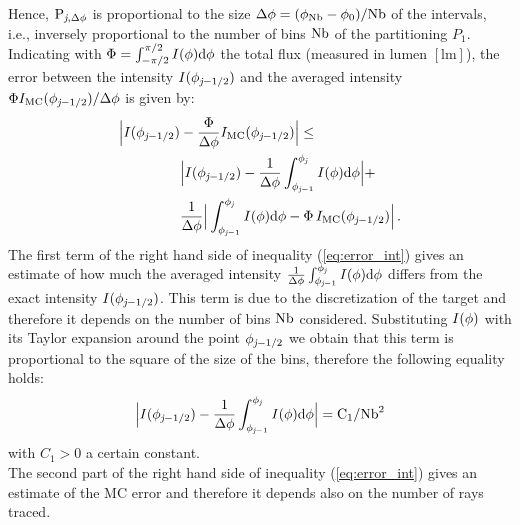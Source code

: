 Hence, $\textrm{P}_{\textit{j}, \Delta\phi}$ is proportional to the size $\Delta\phi= (\phi_{\textrm{Nb}}-\phi_{0})/{\textrm{Nb}}$ 
of the intervals, i.e., inversely proportional to the number of bins $\textrm{Nb}$ of the partitioning $P_1$.
Indicating with $\Phi = \int_{-\pi/2}^{\pi/2}I(\phi) \textrm{d}\phi$ the total flux (measured in lumen $[\textrm{lm}]$),
the error between the intensity $I(\phi_{\textit{j}-1/2})$
 and the averaged  intensity $\Phi I_{\textrm{MC}}(\phi_{\textit{j}-1/2})/\Delta\phi$ is given by:
\begin{equation}\label{eq:error_int}
\begin{aligned}
\Big|I(\phi_{\textit{j}-1/2})&-\frac{\Phi}
{\Delta\phi}I_{\textrm{MC}}(\phi_{\textit{j}-1/2})\Big| \leq\\
 &\Big|I(\phi_{\textit{j}-1/2})-\frac{1}{\Delta \phi}\int_{\phi_{\textit{j}-1}}^{\phi_{\textit{j}}} I(\phi)\textrm{d}\phi\Big|+\\
&\frac{1}{\Delta \phi}\Big|\int_{\phi_{\textit{j}-1}}^{\phi_{\textit{j}}} I(\phi)\textrm{d}\phi-
\Phi\, I_{\textrm{MC}}(\phi_{\textit{j}-1/2})\Big| \,.
\end{aligned}
\end{equation}
\indent The first term of the right hand side of inequality (\ref{eq:error_int}) gives an estimate of how much the averaged intensity
 $\frac{1}{\Delta \phi}\int_{\phi_{\textit{j}-1}}^{\phi_{\textit{j}}} I(\phi)\textrm{d}\phi$ differs from the exact intensity $I(\phi_{\textit{j}-1/2})$.
This term is due to the discretization of the target and therefore it depends on the number of bins $\textrm{Nb}$ considered.
  Substituting $I(\phi)$ with its Taylor expansion around the point $\phi_{\textit{j}-1/2}$ we obtain that this term is proportional to the square of the size of the bins, therefore the following equality holds:
\begin{equation}\Big|I(\phi_{\textit{j}-1/2})-\frac{1}{\Delta \phi}\int_{\phi_{\textit{j}-1}}^{\phi_{\textit{j}}} I(\phi)\textrm{d}\phi\Big| = \textrm{C}_1/\textrm{Nb}^2\end{equation}
with $C_1>0$ a certain constant. \\
\indent
The second part of the right hand side of inequality (\ref{eq:error_int}) gives an estimate of the MC error and therefore it depends also on the
number of rays traced.
